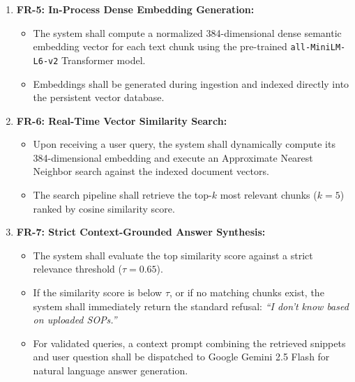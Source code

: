 \begin{enumerate}
    \begin{itemize}
        \item The chunking service shall analyze each text segment against a codified taxonomy of operational section headers (e.g., \emph{Document Control}, \emph{Inbound Operations}, \emph{Trailer Docking}, \emph{Inventory Audit Framework}, \emph{Outbound Operations}, \emph{Safety and PPE}, \emph{Business Continuity}).
        \item Each chunk shall be tagged with its originating filename, physical storage path, page number, section category, and sequential chunk index.
    \end{itemize}
    \item \textbf{FR-5: In-Process Dense Embedding Generation:}
    \begin{itemize}
        \item The system shall compute a normalized 384-dimensional dense semantic embedding vector for each text chunk using the pre-trained \texttt{all-MiniLM-L6-v2} Transformer model.
        \item Embeddings shall be generated during ingestion and indexed directly into the persistent vector database.
    \end{itemize}
    \item \textbf{FR-6: Real-Time Vector Similarity Search:}
    \begin{itemize}
        \item Upon receiving a user query, the system shall dynamically compute its 384-dimensional embedding and execute an Approximate Nearest Neighbor search against the indexed document vectors.
        \item The search pipeline shall retrieve the top-$k$ most relevant chunks ($k=5$) ranked by cosine similarity score.
    \end{itemize}
    \item \textbf{FR-7: Strict Context-Grounded Answer Synthesis:}
    \begin{itemize}
        \item The system shall evaluate the top similarity score against a strict relevance threshold ($\tau = 0.65$).
        \item If the similarity score is below $\tau$, or if no matching chunks exist, the system shall immediately return the standard refusal: \emph{``I don't know based on uploaded SOPs.''}
        \item For validated queries, a context prompt combining the retrieved snippets and user question shall be dispatched to Google Gemini 2.5 Flash for natural language answer generation.

\end{itemize}
\end{enumerate}
